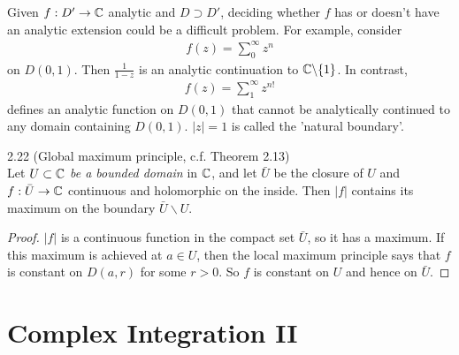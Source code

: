 \documentclass[a4paper]{article}
\begin{document}
\begin{rem}
Given $f:D' \to \mathbb{C}$ analytic and $D \supset D'$, deciding whether $f$ has or doesn't have an analytic extension could be a difficult problem. For example, consider
\begin{equation*}
\begin{aligned}
f(z) = \sum_0^\infty z^n
\end{aligned}
\end{equation*}
on $D(0,1)$. Then $\frac{1}{1-z}$ is an analytic continuation to $\mathbb{C} \backslash \{1\}$. In contrast,
\begin{equation*}
\begin{aligned}
f(z) = \sum_1^\infty z^{n!}
\end{aligned}
\end{equation*}
defines an analytic function on $D(0,1)$ that cannot be analytically continued to any domain containing $D(0,1)$. $|z|=1$ is called the 'natural boundary'.
\end{rem}

\begin{coro} 2.22 (Global maximum principle, c.f. Theorem 2.13)\\
Let $U \subset \mathbb{C}$ \emph{be a bounded domain} in $\mathbb{C}$, and let $\bar{U}$ be the closure of $U$ and $f:\bar{U} \to \mathbb{C}$ continuous and holomorphic on the inside. Then $|f|$ contains its maximum on the boundary $\bar{U} \backslash U$.
\begin{proof}
$|f|$ is a continuous function in the compact set $\bar{U}$, so it has a maximum. If this maximum is achieved at $a \in U$, then the local maximum principle says that $f$ is constant on $D(a,r)$ for some $r>0$. So $f$ is constant on $U$ and hence on $\bar{U}$.
\end{proof}
\end{coro}

\newpage

\section{Complex Integration II}
\end{document}
